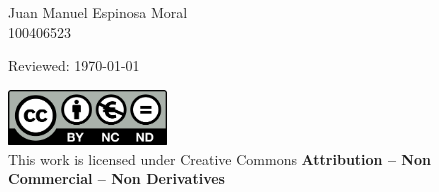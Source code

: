 \documentclass[../main.tex]{subfiles}
\begin{document}
\begin{titlepage}
\begin{sffamily}
\begin{center}
			\begin{Large}
				Juan Manuel Espinosa Moral\\
				100406523\\
			\end{Large}


		\end{center}

		\vfill

		{Reviewed: \today}\\

		\color{black}

		\includegraphics[width=4.2cm]{images/UC3M/creativecommons.png}\\
		This work is licensed under Creative Commons \textbf{Attribution – Non Commercial – Non Derivatives}
	\end{sffamily}
\end{titlepage}
\end{document}
